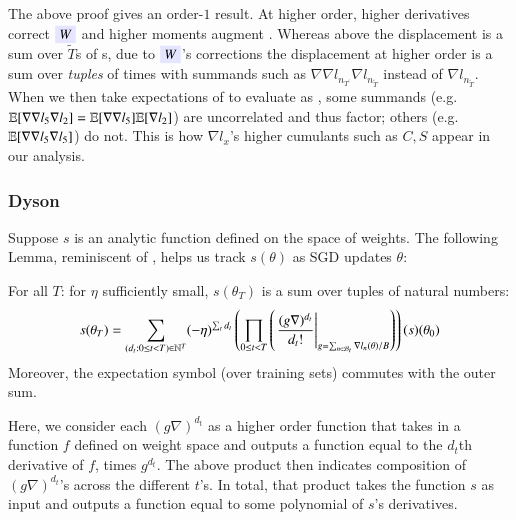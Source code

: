     The above proof gives an order-$1$ result.  %
At higher order, higher derivatives correct
${\translucent{moosky}{$W$}}$
and higher
moments augment
.
%
%
Whereas above the displacement is a sum over $\tilde T$s of
s, due to ${\translucent{moosky}{$W$}}$'s
corrections the displacement at higher order is a sum over \emph{tuples} of
times with summands such as $\nabla\nabla l_{n_{T^\prime}} \nabla l_{n_{\tilde
T}}$ instead of $\nabla l_{n_{\tilde T}}$.
%
When we then take expectations of  to evaluate 
 as  
,
some summands (e.g.\ $\mathbb{E}[\nabla\nabla l_{5}
\nabla l_{2}]=\mathbb{E}[\nabla\nabla l_{5}]
\mathbb{E}[\nabla l_{2}]$) are uncorrelated and thus factor; others (e.g.\ $\mathbb{E}[\nabla\nabla
l_{5} \nabla l_{5}]$) do not.  This is how $\nabla l_x$'s higher cumulants such
as $C, S$ appear in our analysis.
%

        \subsubsection{Dyson}

        Suppose $s$ is an analytic function defined on the space of weights.
        The following Lemma, reminiscent of \cite{dy49a}, helps us track
        $s(\theta)$ as SGD updates $\theta$:
        \begin{klem*} \label{lem:dyson}
            For all $T$: for $\eta$ sufficiently small, $s(\theta_T)$ is a sum
            over tuples of natural numbers:
            \begin{equation}\label{eq:dyson2}
                s(\theta_T) = 
                \sum_{(d_t: 0\leq t<T) \in \mathbb{N}^T}
                (-\eta)^{\sum_t d_t}
                \left(
                    \prod_{0 \leq t < T}
                        \left(\left.
                            \frac{(g \nabla)^{d_t}}{d_t!}
                        \right|_{g = \sum_{n\in \mathcal{B}_t} \nabla l_n(\theta) / B}\right)
                \right)(s) (\theta_0)
            \end{equation}
            Moreover, the expectation symbol (over training sets) commutes with
            the outer sum.
        \end{klem*}
        Here, we consider each $(g \nabla)^{d_t}$ as a higher order function
        that takes in a function $f$ defined on weight space and outputs a
        function equal to the $d_t$th derivative of $f$, times $g^{d_t}$.
        The above product then indicates composition of $(g \nabla)^{d_t}$'s
        across the different $t$'s.  In total, that product takes the function
        $s$ as input and outputs a function equal to some polynomial of $s$'s
        derivatives.

